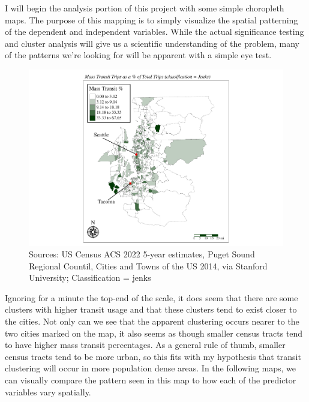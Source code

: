 \documentclass[
]{article}
\begin{document}
I will begin the analysis portion of this project with some simple
choropleth maps. The purpose of this mapping is to simply visualize the
spatial patterning of the dependent and independent variables. While the
actual significance testing and cluster analysis will give us a
scientific understanding of the problem, many of the patterns we're
looking for will be apparent with a simple eye test.

\begin{figure}
\centering
\includegraphics{transit-hotspots-PSRC_files/figure-latex/unnamed-chunk-3-1.pdf}
\caption{Sources: US Census ACS 2022 5-year estimates, Puget Sound
Regional Countil, Cities and Towns of the US 2014, via Stanford
University; Classification = jenks}
\end{figure}

Ignoring for a minute the top-end of the scale, it does seem that there
are some clusters with higher transit usage and that these clusters tend
to exist closer to the cities. Not only can we see that the apparent
clustering occurs nearer to the two cities marked on the map, it also
seems as though smaller census tracts tend to have higher mass transit
percentages. As a general rule of thumb, smaller census tracts tend to
be more urban, so this fits with my hypothesis that transit clustering
will occur in more population dense areas. In the following maps, we can
visually compare the pattern seen in this map to how each of the
predictor variables vary spatially.

\newpage
\end{document}
